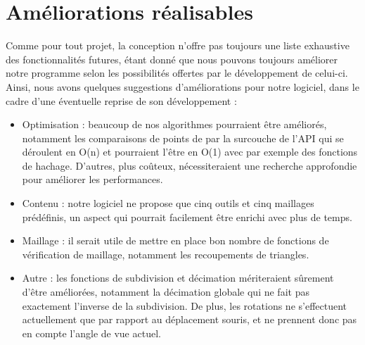 \documentclass[a4paper]{memoir}
\begin{document}
		\section{Améliorations réalisables}
			Comme pour tout projet, la conception n'offre pas toujours une liste exhaustive des fonctionnalités futures, étant donné que nous pouvons 
			toujours améliorer notre programme selon les possibilités offertes par le développement de celui-ci. Ainsi, nous avons quelques suggestions 
			d'améliorations pour notre logiciel, dans le cadre d'une éventuelle reprise de son développement :
			\begin{itemize}
				\item Optimisation : beaucoup de nos algorithmes pourraient être améliorés, notamment les comparaisons de points de par la surcouche de 
				l'API qui se déroulent en O(n) et pourraient l'être en O(1) avec par exemple des fonctions de hachage. D'autres, plus coûteux, 
				nécessiteraient une recherche approfondie pour améliorer les performances.
				\item Contenu : notre logiciel ne propose que cinq outils et cinq maillages prédéfinis, un aspect qui pourrait facilement être enrichi 
				avec plus de temps.
				\item Maillage : il serait utile de mettre en place bon nombre de fonctions de vérification de maillage, notamment les recoupements de 
				triangles.
				\item Autre : les fonctions de subdivision et décimation mériteraient sûrement d'être améliorées, notamment la décimation globale qui ne
				fait pas exactement l'inverse de la subdivision. De plus, les rotations ne s'effectuent actuellement que par rapport au déplacement souris,
				et ne prennent donc pas en compte l'angle de vue actuel.
			\end{itemize}

\end{document}
